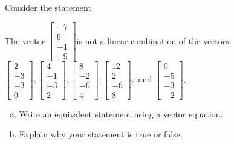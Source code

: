 
\begin{exerciseStatement}


Consider the statement 
\begin{center}\begin{minipage}{0.8\textwidth}
 The vector \( \left[\begin{array}{c}
-7 \\
6 \\
-1 \\
-9
\end{array}\right] \)is not a linear combination of the vectors \( \left[\begin{array}{c}
2 \\
-3 \\
-3 \\
0
\end{array}\right] , \left[\begin{array}{c}
4 \\
-1 \\
-3 \\
2
\end{array}\right] , \left[\begin{array}{c}
8 \\
-2 \\
-6 \\
4
\end{array}\right] , \left[\begin{array}{c}
12 \\
2 \\
-6 \\
8
\end{array}\right] , \text{ and } \left[\begin{array}{c}
0 \\
-5 \\
-3 \\
-2
\end{array}\right] \). 
\end{minipage}\end{center}
    


\begin{enumerate}[(a)]
\item  Write an equivalent statement using a vector equation.
\item  Explain why your statement is true or false.
\end{enumerate}
    
\end{exerciseStatement}
    

